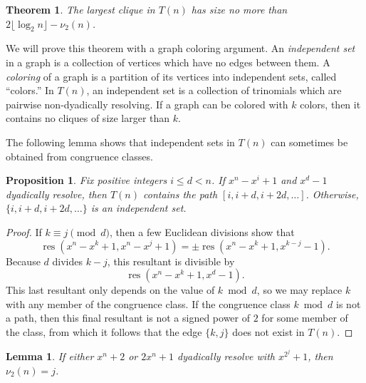 \documentclass[]{article}
\newtheorem{lemma}{Lemma}[section]
\newtheorem{theorem}{Theorem}[section]
\newtheorem{proposition}{Proposition}[section]
\theoremstyle{definition}
\DeclareMathOperator{\res}{res}
\newcommand{\tri}[3]{\ensuremath{#1^{#2} - #1^{#3} + 1}}
\begin{document}
\begin{theorem}
    \label{clique-bound} The largest clique in $T(n)$ has size no more than $2
    \lfloor \log_2 n \rfloor - \nu_2(n)$.
\end{theorem}

We will prove this theorem with a graph coloring argument. An \emph{independent
set} in a graph is a collection of vertices which have no edges between them. A
\emph{coloring} of a graph is a partition of its vertices into independent sets,
called ``colors.'' In $T(n)$, an independent set is a collection of trinomials
which are pairwise non-dyadically resolving. If a graph can be colored with $k$
colors, then it contains no cliques of size larger than $k$.

The following lemma shows that independent sets in $T(n)$ can sometimes be
obtained from congruence classes.

\begin{proposition}
    Fix positive integers $i \leq d < n$. If $x^n - x^i + 1$ and $x^d - 1$
    dyadically resolve, then $T(n)$ contains the path $[i, i + d, i + 2d,
    \dots]$. Otherwise, $\{i, i + d, i + 2d, \dots\}$ is an independent set.
\end{proposition}

\begin{proof}
    If $k \equiv j \pmod{d}$, then a few Euclidean divisions show that
    \begin{equation*}
        \res(x^n - x^k + 1, x^n - x^j + 1)
        =
        \pm
        \res(x^n - x^k + 1, x^{k - j} - 1).
    \end{equation*}
    Because $d$ divides $k - j$, this resultant is divisible by
    \begin{equation*}
        \res(\tri{x}{n}{k}, x^d - 1).
    \end{equation*}
    This last resultant only depends on the value of $k \bmod d$, so we may
    replace $k$ with any member of the congruence class. If the congruence
    class $k \bmod d$ is not a path, then this final resultant is not a signed
    power of $2$ for some member of the class, from which it follows that the
    edge $\{k, j\}$ does not exist in $T(n)$.
\end{proof}

\begin{lemma}
    If either $x^n + 2$ or $2 x^n + 1$ dyadically resolve with $x^{2^j} + 1$,
    then $\nu_2(n) = j$.
\end{lemma}
\end{document}
